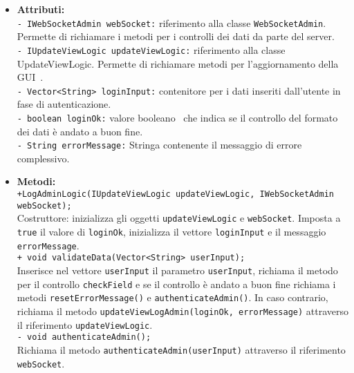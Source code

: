 {{\begin{sloppypar}
{{\begin{itemize}
					\item[] \textbf{Attributi:}{\\
						\texttt{- IWebSocketAdmin webSocket:} riferimento alla classe \texttt{WebSocketAdmin}.
							Permette di richiamare i metodi per i controlli dei dati da parte del server.\\

						\texttt{- IUpdateViewLogic updateViewLogic:} riferimento alla classe UpdateViewLogic.
						Permette di richiamare metodi per l'aggiornamento della GUI\g~.\\

						\texttt{- Vector<String> loginInput:} contenitore per i dati inseriti dall'utente in fase di autenticazione.\\

						\texttt{- boolean loginOk:} valore booleano\g~ che indica se il controllo del formato dei dati è andato a buon fine.\\

						\texttt{- String errorMessage:} Stringa contenente il messaggio di errore complessivo.\\
					}
					
					\item[] \textbf{Metodi:}{ \\
					\texttt{+LogAdminLogic(IUpdateViewLogic updateViewLogic, IWebSocketAdmin webSocket);}\\
					Costruttore: inizializza gli oggetti \texttt{updateViewLogic} e \texttt{webSocket}. Imposta a \texttt{true} il valore di \texttt{loginOk}, inizializza il vettore \texttt{loginInput} e il messaggio \texttt{errorMessage}.\\

					\texttt{+ void validateData(Vector<String> userInput);}\\
					Inserisce nel vettore \texttt{userInput} il parametro \texttt{userInput}, richiama il metodo per il controllo \texttt{checkField} e se il controllo è andato a buon fine richiama i metodi \texttt{resetErrorMessage()} e \texttt{authenticateAdmin()}. In caso contrario, richiama il metodo \texttt{updateViewLogAdmin(loginOk, errorMessage)} attraverso il riferimento \texttt{updateViewLogic}.\\

					\texttt{- void authenticateAdmin();}\\
						Richiama il metodo \texttt{authenticateAdmin(userInput)} attraverso il riferimento \texttt{webSocket}.\\

}
\end{itemize}}}
\end{sloppypar}}}
